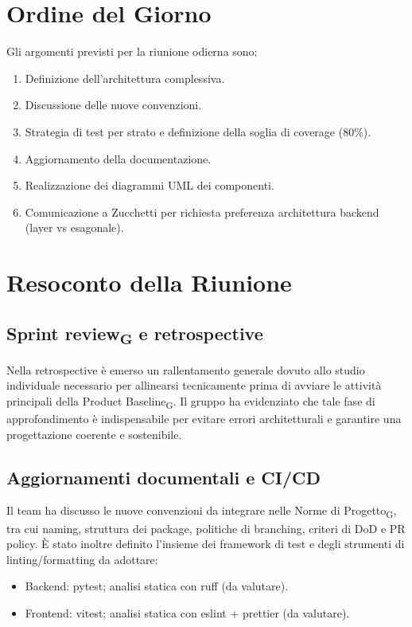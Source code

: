 \section{Ordine del Giorno}
Gli argomenti previsti per la riunione odierna sono:
\begin{enumerate}
	\item Definizione dell’architettura complessiva.
    \item Discussione delle nuove convenzioni.
    \item Strategia di test per strato e definizione della soglia di coverage (80\%).
    \item Aggiornamento della documentazione.
    \item Realizzazione dei diagrammi UML dei componenti.
    \item Comunicazione a Zucchetti per richiesta preferenza architettura backend (layer vs esagonale).
\end{enumerate}

\section{Resoconto della Riunione}

\subsection{Sprint review\textsubscript{G} e retrospective}  
Nella retrospective è emerso un rallentamento generale dovuto allo studio individuale necessario per allinearsi tecnicamente prima di avviare le attività principali della Product Baseline\textsubscript{G}. Il gruppo ha evidenziato che tale fase di approfondimento è indispensabile per evitare errori architetturali e garantire una progettazione coerente e sostenibile.

\subsection{Aggiornamenti documentali e CI/CD}
Il team ha discusso le nuove convenzioni da integrare nelle Norme di Progetto\textsubscript{G}, tra cui naming, struttura dei package, politiche di branching, criteri di DoD e PR policy. È stato inoltre definito l’insieme dei framework di test e degli strumenti di linting/formatting da adottare:  
\begin{itemize}
    \item Backend: pytest; analisi statica con ruff (da valutare).
    \item Frontend: vitest; analisi statica con eslint + prettier (da valutare).
\end{itemize}

